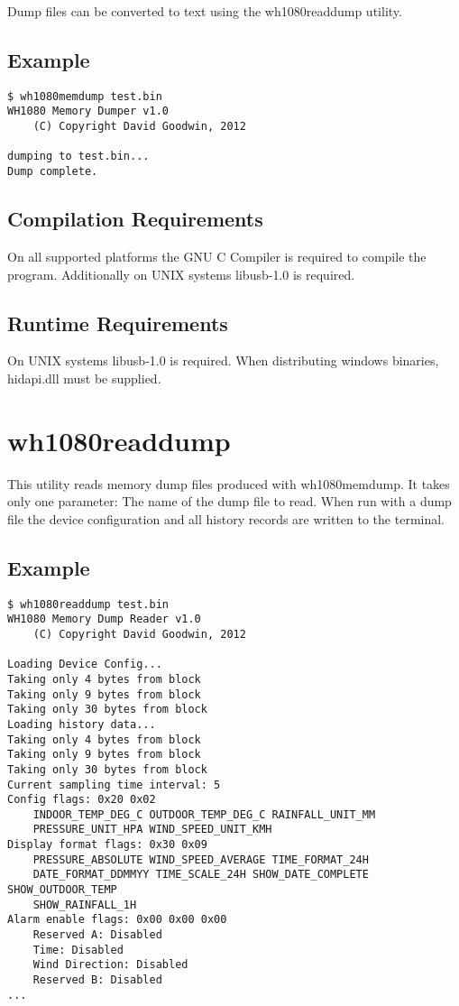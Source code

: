 \documentclass[a4paper,10pt,draft]{book}
\begin{document}
Dump files can be converted to text using the wh1080readdump utility.

\section{Example}
\begin{verbatim}
$ wh1080memdump test.bin
WH1080 Memory Dumper v1.0
	(C) Copyright David Goodwin, 2012

dumping to test.bin...
Dump complete.
\end{verbatim}


\section{Compilation Requirements}
On all supported platforms the GNU C Compiler is required to compile the program. Additionally on UNIX systems libusb-1.0 is required.

\section{Runtime Requirements}
On UNIX systems libusb-1.0 is required. When distributing windows binaries, hidapi.dll must be supplied.

\chapter{wh1080readdump}

This utility reads memory dump files produced with wh1080memdump. It takes only one parameter: The name of the dump file to read. When run with a dump file the device configuration and all history records are written to the terminal.

\section{Example}
\begin{verbatim}
$ wh1080readdump test.bin
WH1080 Memory Dump Reader v1.0
	(C) Copyright David Goodwin, 2012

Loading Device Config...
Taking only 4 bytes from block
Taking only 9 bytes from block
Taking only 30 bytes from block
Loading history data...
Taking only 4 bytes from block
Taking only 9 bytes from block
Taking only 30 bytes from block
Current sampling time interval: 5
Config flags: 0x20 0x02
	INDOOR_TEMP_DEG_C OUTDOOR_TEMP_DEG_C RAINFALL_UNIT_MM 
	PRESSURE_UNIT_HPA WIND_SPEED_UNIT_KMH 
Display format flags: 0x30 0x09
	PRESSURE_ABSOLUTE WIND_SPEED_AVERAGE TIME_FORMAT_24H 
	DATE_FORMAT_DDMMYY TIME_SCALE_24H SHOW_DATE_COMPLETE SHOW_OUTDOOR_TEMP 
	SHOW_RAINFALL_1H 
Alarm enable flags: 0x00 0x00 0x00
	Reserved A: Disabled
	Time: Disabled
	Wind Direction: Disabled
	Reserved B: Disabled
...
\end{verbatim}
\end{document}
